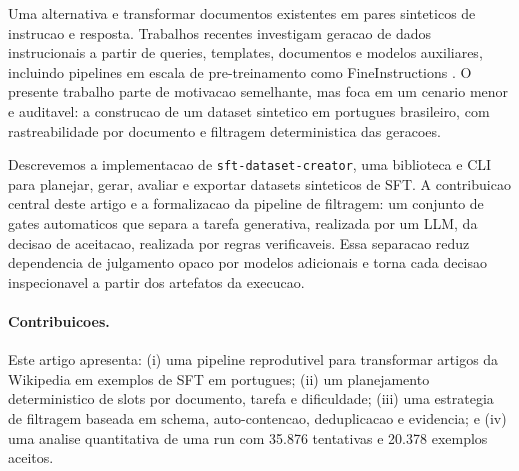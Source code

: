 \documentclass{article}
\newcommand{\toolname}{\texttt{sft-dataset-creator}}
\begin{document}
Uma alternativa e transformar documentos existentes em pares sinteticos de
instrucao e resposta. Trabalhos recentes investigam geracao de dados
instrucionais a partir de queries, templates, documentos e modelos auxiliares,
incluindo pipelines em escala de pre-treinamento como FineInstructions
\citep{patel2026fineinstructions}. O presente trabalho parte de motivacao
semelhante, mas foca em um cenario menor e auditavel: a construcao de um
dataset sintetico em portugues brasileiro, com rastreabilidade por documento e
filtragem deterministica das geracoes.

Descrevemos a implementacao de \toolname{}, uma biblioteca e CLI para planejar,
gerar, avaliar e exportar datasets sinteticos de SFT. A contribuicao central
deste artigo e a formalizacao da pipeline de filtragem: um conjunto de gates
automaticos que separa a tarefa generativa, realizada por um LLM, da decisao de
aceitacao, realizada por regras verificaveis. Essa separacao reduz dependencia
de julgamento opaco por modelos adicionais e torna cada decisao inspecionavel a
partir dos artefatos da execucao.

\paragraph{Contribuicoes.}
Este artigo apresenta:
(i) uma pipeline reprodutivel para transformar artigos da Wikipedia em exemplos
de SFT em portugues;
(ii) um planejamento deterministico de slots por documento, tarefa e
dificuldade;
(iii) uma estrategia de filtragem baseada em schema, auto-contencao,
deduplicacao e evidencia;
e (iv) uma analise quantitativa de uma run com 35.876 tentativas e 20.378
exemplos aceitos.
\end{document}
